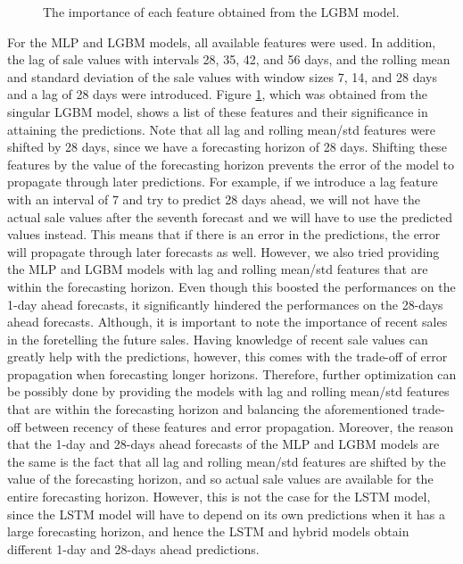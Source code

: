 \begin{figure}[b!]
    \centering
    \caption{The importance of each feature obtained from the LGBM model.}
    \label{fig:feat_imp}
\end{figure}
For the MLP and LGBM models, all available features were used. In addition, the lag of sale values with intervals 28, 35, 42, and 56 days, and the rolling mean and standard deviation of the sale values with window sizes 7, 14, and 28 days and a lag of 28 days were introduced.
Figure \ref{fig:feat_imp}, which was obtained from the singular LGBM model, shows a list of these features and their significance in attaining the predictions.
Note that all lag and rolling mean/std features were shifted by 28 days, since we have a forecasting horizon of 28 days.
Shifting these features by the value of the forecasting horizon prevents the error of the model to propagate through later predictions.
For example, if we introduce a lag feature with an interval of 7 and try to predict 28 days ahead, we will not have the actual sale values after the seventh forecast and we will have to use the predicted values instead. 
This means that if there is an error in the predictions, the error will propagate through later forecasts as well.
However, we also tried providing the MLP and LGBM models with lag and rolling mean/std features that are within the forecasting horizon. 
Even though this boosted the performances on the 1-day ahead forecasts, it significantly hindered the performances on the 28-days ahead forecasts.
Although, it is important to note the importance of recent sales in the foretelling the future sales. 
Having knowledge of recent sale values can greatly help with the predictions, however, this comes with the trade-off of error propagation when forecasting longer horizons.
Therefore, further optimization can be possibly done by providing the models with lag and rolling mean/std features that are within the forecasting horizon and balancing the aforementioned trade-off between recency of these features and error propagation.
Moreover, the reason that the 1-day and 28-days ahead forecasts of the MLP and LGBM models are the same is the fact that all lag and rolling mean/std features are shifted by the value of the forecasting horizon, and so actual sale values are available for the entire forecasting horizon.
However, this is not the case for the LSTM model, since the LSTM model will have to depend on its own predictions when it has a large forecasting horizon, and hence the LSTM and hybrid models obtain different 1-day and 28-days ahead predictions.